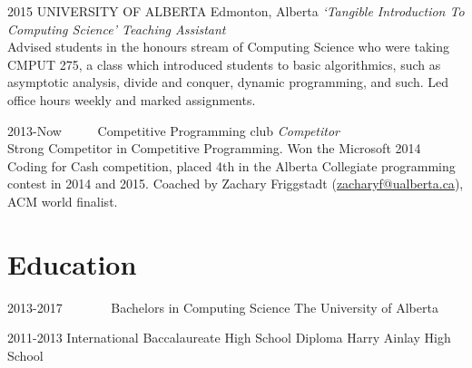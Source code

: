 \documentclass{friggeri-cv} %
\begin{document}
\begin{entrylist}

\entry
{2015}
{UNIVERSITY OF ALBERTA}
{Edmonton, Alberta}
{\emph{`Tangible Introduction To Computing Science' Teaching Assistant} \\
Advised students in the honours stream of Computing Science who were taking CMPUT 275, a class which introduced students to basic algorithmics, such as asymptotic analysis, divide and conquer, dynamic programming, and such. Led office hours weekly and marked assignments.}


\entry
{2013-Now\ \ \ \ \ }
{Competitive Programming club}
{}
{\emph{Competitor} \\
Strong Competitor in Competitive Programming. Won the Microsoft 2014 Coding for Cash competition, placed 4th in the Alberta Collegiate programming contest in 2014 and 2015. Coached by Zachary Friggstadt (\href{mailto:zacharyf@ualberta.ca}{zacharyf@ualberta.ca}), ACM world finalist.}

\end{entrylist}


\section{Education}

\begin{entrylist}


\entry
{2013-2017\ \ \ \ \ \ \ }
{Bachelors {\normalfont in Computing Science}}
{The University of Alberta}


\entry
{2011-2013}
{International Baccalaureate {\normalfont High School Diploma}}
{Harry Ainlay High School}


\end{entrylist}
\end{document}
